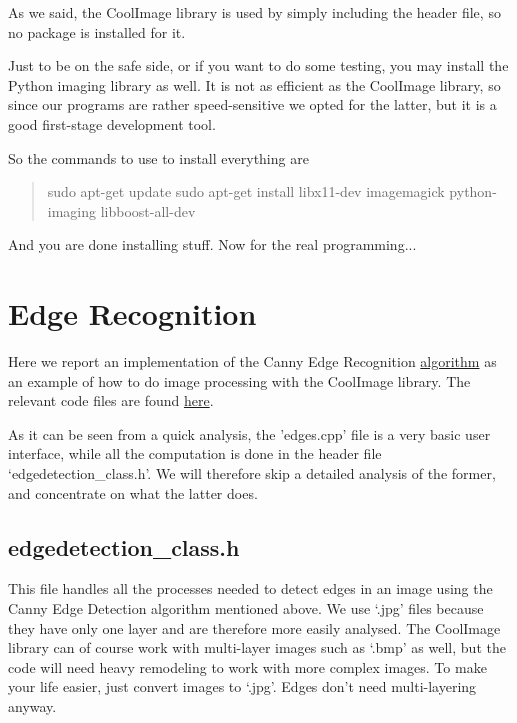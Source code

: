 \documentclass[a4paper]{article}
\begin{document}
			As we said, the CoolImage library is used by simply including the header file, so no package is installed for it.
			
			Just to be on the safe side, or if you want to do some testing, you may install the Python imaging library as well.
			It is not as efficient as the CoolImage library, so since our programs are rather speed-sensitive we opted for the latter, but it is a good first-stage development tool.
			
			So the commands to use to install everything are
			
			\begin{quote}
				sudo apt-get update
				sudo apt-get install libx11-dev imagemagick python-imaging libboost-all-dev
			\end{quote}
			
			And you are done installing stuff.
			Now for the real programming...
			
			
	\section*{Edge Recognition}
	
		Here we report an implementation of the Canny Edge Recognition \href{http://en.wikipedia.org/wiki/Canny_edge_detector}{algorithm} as an example of how to do image processing with the CoolImage library.
		The relevant code files are found \href{https://github.com/OpenLabTools/Microscope/tree/master/Raspberry%20Pi}{here}.
		
		As it can be seen from a quick analysis, the 'edges.cpp' file is a very basic user interface, while all the computation is done in the header file `edgedetection\_class.h'.
		We will therefore skip a detailed analysis of the former, and concentrate on what the latter does.
		
	\subsection*{edgedetection\_class.h}
	
			This file handles all the processes needed to detect edges in an image using the Canny Edge Detection algorithm mentioned above.
			We use `.jpg' files because they have only one layer and are therefore more easily analysed.
			The CoolImage library can of course work with multi-layer images such as `.bmp' as well, but the code will need heavy remodeling to work with more complex images.
			To make your life easier, just convert images to `.jpg'.
			Edges don't need multi-layering anyway.
			
\end{document}
